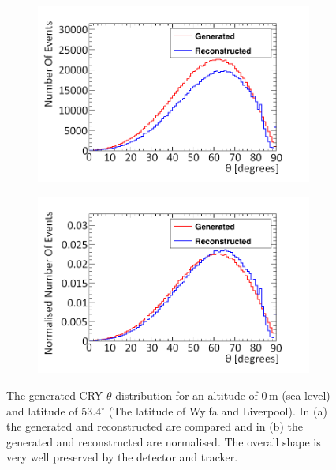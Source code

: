\begin{figure}[!h]
\centering
\begin{subfigure}{.5\textwidth}
  \centering
  \includegraphics[width=\linewidth]{Chapter6/Figs/Raster/thetaGenRecoCryMedText.png}
  \captionsetup{width=.9\linewidth}
  \caption{}
  \label{subFig:thetaGenRecoCry}
\end{subfigure}%
\begin{subfigure}{.5\textwidth}
  \centering
\includegraphics[width=\linewidth]{Chapter6/Figs/Raster/thetaGenRecoCryNormMedText.png}
  \captionsetup{width=.9\linewidth}
  \caption{}
  \label{subFig:thetaGenRecoCryNorm}
\end{subfigure}
\caption[Generated CRY $\theta$ distribution for an altitude of 0\,m (sea-level).]{The generated CRY $\theta$ distribution for an altitude of 0\,m (sea-level) and latitude of 53.4$^\circ$ (The latitude of Wylfa and Liverpool). In (a) the generated and reconstructed are compared and in (b) the generated and reconstructed are normalised. The overall shape is very well preserved by the detector and tracker.}
\label{fig:thetaGenRecoCryAndNorm}
\end{figure}

